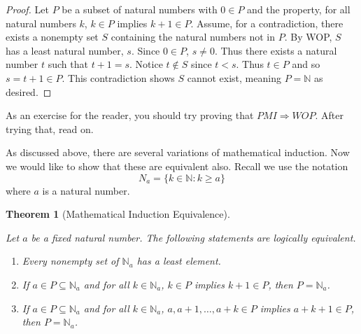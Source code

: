 \documentclass[
  twoside,
  12pt,
  letterpaper]{article}
\providecommand{\tightlist}{%
  \setlength{\itemsep}{0pt}\setlength{\parskip}{0pt}}\usepackage{longtable,booktabs,array}
\theoremstyle{definition}
\theoremstyle{definition}
\theoremstyle{plain}
\newtheorem{theorem}{Theorem}[section]
\theoremstyle{definition}
\theoremstyle{plain}
\theoremstyle{remark}
\begin{document}
\begin{proof}

Let \(P\) be a subset of natural numbers with \(0\in P\) and the
property, for all natural numbers \(k\), \(k\in P\) implies
\(k+1\in P\). Assume, for a contradiction, there exists a nonempty set
\(S\) containing the natural numbers not in \(P\). By WOP, \(S\) has a
least natural number, \(s\). Since \(0\in P\), \(s\neq 0\). Thus there
exists a natural number \(t\) such that \(t+1=s\). Notice \(t\not\in S\)
since \(t<s\). Thus \(t\in P\) and so \(s=t+1\in P\). This contradiction
shows \(S\) cannot exist, meaning \(P=\mathbb{N}\) as desired.

\end{proof}

As an exercise for the reader, you should try proving that
\(PMI\Rightarrow WOP\). After trying that, read on.

As discussed above, there are several variations of mathematical
induction. Now we would like to show that these are equivalent also.
Recall we use the notation \begin{equation}
N_a = \{k\in \mathbb{N}: k\geq a\}
\end{equation} where \(a\) is a natural number.

\begin{theorem}[Mathematical Induction
Equivalence]\protect\hypertarget{thm-mathematical-induction-equivalence}{}\label{thm-mathematical-induction-equivalence}

Let \(a\) be a fixed natural number. The following statements are
logically equivalent.

\begin{enumerate}
\def\labelenumi{\arabic{enumi}.}
\tightlist
\item
  Every nonempty set of \(\mathbb{N}_a\) has a least element.
\item
  If \(a\in P\subseteq\mathbb{N}_a\) and for all \(k\in \mathbb{N}_a\),
  \(k \in P\) implies \(k+1 \in P\), then \(P=\mathbb{N}_a\).
\item
  If \(a\in P\subseteq\mathbb{N}_a\) and for all \(k\in \mathbb{N}_a\),
  \(a,a+1,\ldots,a+k \in P\) implies \(a+k+1 \in P\), then
  \(P=\mathbb{N}_a\).
\end{enumerate}

\end{theorem}
\end{document}
